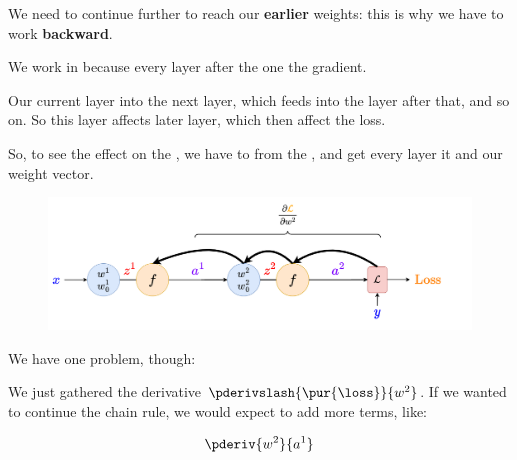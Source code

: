         We need to continue further to reach our \textbf{earlier} weights: this is why we have to work \textbf{backward}.\\
        
        \begin{concept}
            We work  in  because every layer after the  one  the gradient.
            
            Our current layer  into the next layer, which feeds into the layer after that, and so on. So this layer affects  later layer, which then affect the loss.
            
            So, to see the effect on the , we have to  from the , and get every layer  it and our weight vector.
        \end{concept}
            
            
        \phantom{ }
            
        \begin{figure}[H]
            \centering
            \includegraphics[width=120mm,scale=0.4]{images/nn_2_images/two_neurons_inside_bp2.png}
        \end{figure}
            
        We have one problem, though: 
        
        We just gathered the derivative $\pderivslash {\pur{\loss}} {w^2} $. If we wanted to continue the chain rule, we would expect to add more terms, like:
        
        \begin{equation}
            \pderiv{w^2}{a^1}
        \end{equation}
        
